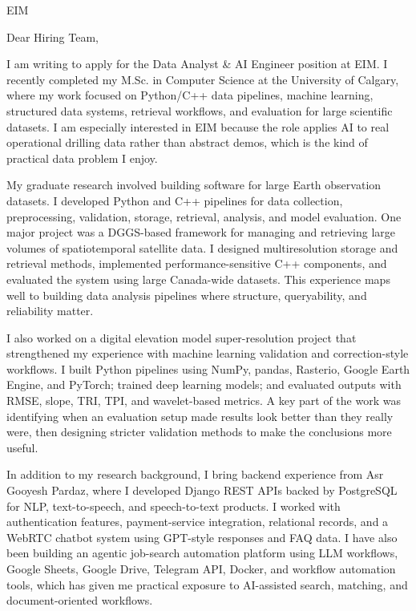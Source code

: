 \documentclass[11pt]{letter}
\begin{document}
\begin{letter}{EIM}

\opening{Dear Hiring Team,}

I am writing to apply for the Data Analyst \& AI Engineer position at EIM. I recently completed my M.Sc. in Computer Science at the University of Calgary, where my work focused on Python/C++ data pipelines, machine learning, structured data systems, retrieval workflows, and evaluation for large scientific datasets. I am especially interested in EIM because the role applies AI to real operational drilling data rather than abstract demos, which is the kind of practical data problem I enjoy.

My graduate research involved building software for large Earth observation datasets. I developed Python and C++ pipelines for data collection, preprocessing, validation, storage, retrieval, analysis, and model evaluation. One major project was a DGGS-based framework for managing and retrieving large volumes of spatiotemporal satellite data. I designed multiresolution storage and retrieval methods, implemented performance-sensitive C++ components, and evaluated the system using large Canada-wide datasets. This experience maps well to building data analysis pipelines where structure, queryability, and reliability matter.

I also worked on a digital elevation model super-resolution project that strengthened my experience with machine learning validation and correction-style workflows. I built Python pipelines using NumPy, pandas, Rasterio, Google Earth Engine, and PyTorch; trained deep learning models; and evaluated outputs with RMSE, slope, TRI, TPI, and wavelet-based metrics. A key part of the work was identifying when an evaluation setup made results look better than they really were, then designing stricter validation methods to make the conclusions more useful.

In addition to my research background, I bring backend experience from Asr Gooyesh Pardaz, where I developed Django REST APIs backed by PostgreSQL for NLP, text-to-speech, and speech-to-text products. I worked with authentication features, payment-service integration, relational records, and a WebRTC chatbot system using GPT-style responses and FAQ data. I have also been building an agentic job-search automation platform using LLM workflows, Google Sheets, Google Drive, Telegram API, Docker, and workflow automation tools, which has given me practical exposure to AI-assisted search, matching, and document-oriented workflows.


\end{letter}
\end{document}

